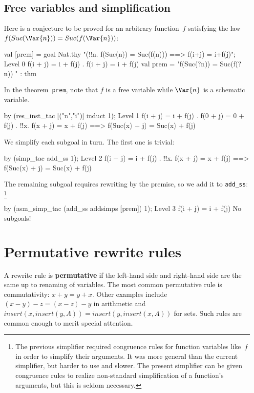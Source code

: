\subsection{Free variables and simplification}
Here is a conjecture to be proved for an arbitrary function~$f$ satisfying
the law $f(Suc(\Var{n})) = Suc(f(\Var{n}))$:
\begin{ttbox}
val [prem] = goal Nat.thy
    "(!!n. f(Suc(n)) = Suc(f(n))) ==> f(i+j) = i+f(j)";
{\out Level 0}
{\out f(i + j) = i + f(j)}
{. f(i + j) = i + f(j)}
\ttbreak
{\out val prem = "f(Suc(?n)) = Suc(f(?n))}
{\out             [!!n. f(Suc(n)) = Suc(f(n))]" : thm}
\end{ttbox}
In the theorem~{\tt prem}, note that $f$ is a free variable while
$\Var{n}$ is a schematic variable.
\begin{ttbox}
by (res_inst_tac [("n","i")] induct 1);
{\out Level 1}
{\out f(i + j) = i + f(j)}
{. f(0 + j) = 0 + f(j)}
{. !!x. f(x + j) = x + f(j) ==> f(Suc(x) + j) = Suc(x) + f(j)}
\end{ttbox}
We simplify each subgoal in turn.  The first one is trivial:
\begin{ttbox}
by (simp_tac add_ss 1);
{\out Level 2}
{\out f(i + j) = i + f(j)}
{. !!x. f(x + j) = x + f(j) ==> f(Suc(x) + j) = Suc(x) + f(j)}
\end{ttbox}
The remaining subgoal requires rewriting by the premise, so we add it to
{\tt add_ss}:%
\footnote{The previous simplifier required congruence rules for function
  variables like~$f$ in order to simplify their arguments.  It was more
  general than the current simplifier, but harder to use and slower.  The
  present simplifier can be given congruence rules to realize non-standard
  simplification of a function's arguments, but this is seldom necessary.}
\begin{ttbox}
by (asm_simp_tac (add_ss addsimps [prem]) 1);
{\out Level 3}
{\out f(i + j) = i + f(j)}
{\out No subgoals!}
\end{ttbox}


\section{Permutative rewrite rules}

A rewrite rule is {\bf permutative} if the left-hand side and right-hand
side are the same up to renaming of variables.  The most common permutative
rule is commutativity: $x+y = y+x$.  Other examples include $(x-y)-z =
(x-z)-y$ in arithmetic and $insert(x,insert(y,A)) = insert(y,insert(x,A))$
for sets.  Such rules are common enough to merit special attention.

